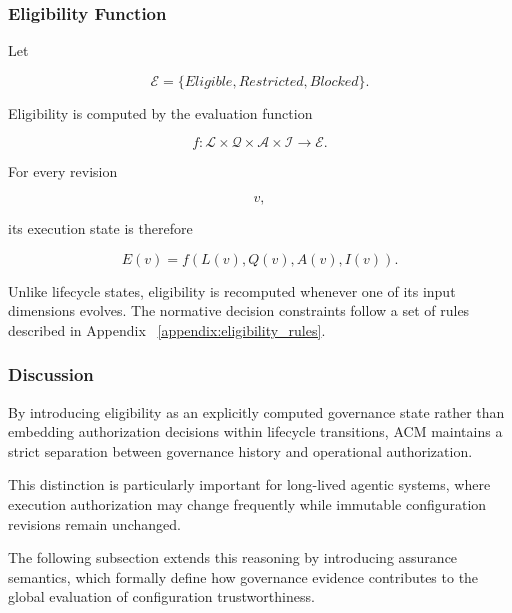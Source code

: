 \documentclass[10pt]{article}
\begin{document}
\subsubsection{Eligibility Function}

Let

\begin{equation}
\mathcal{E}
=
\{
Eligible,
Restricted,
Blocked
\}.
\label{eq:eligibility_state}
\end{equation}

Eligibility is computed by the evaluation function

\begin{equation}
f
:
\mathcal{L}
\times
\mathcal{Q}
\times
\mathcal{A}
\times
\mathcal{I}
\rightarrow
\mathcal{E}.
\label{eq:eligibility_function}
\end{equation}

For every revision

\[
v,
\]

its execution state is therefore

\begin{equation}
E(v)
=
f
(
L(v),
Q(v),
A(v),
I(v)
).
\label{eq:eligibility_execution_state}
\end{equation}

Unlike lifecycle states, eligibility is recomputed whenever one of its input
dimensions evolves. The normative decision constraints follow a set of rules described in Appendix ~\ref{appendix:eligibility_rules}.



\subsubsection{Discussion}

By introducing eligibility as an explicitly computed governance state rather
than embedding authorization decisions within lifecycle transitions, ACM
maintains a strict separation between governance history and operational
authorization.

This distinction is particularly important for long-lived agentic systems,
where execution authorization may change frequently while immutable
configuration revisions remain unchanged.

The following subsection extends this reasoning by introducing assurance
semantics, which formally define how governance evidence contributes to the
global evaluation of configuration trustworthiness.
\end{document}
